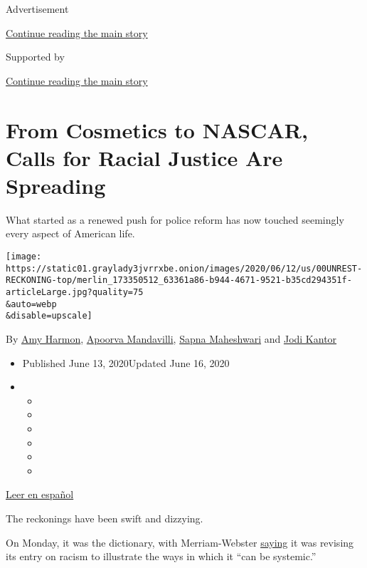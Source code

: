 Advertisement

\protect\hyperlink{after-top}{Continue reading the main story}

Supported by

\protect\hyperlink{after-sponsor}{Continue reading the main story}

\hypertarget{from-cosmetics-to-nascar-calls-for-racial-justice-are-spreading}{%
\section{From Cosmetics to NASCAR, Calls for Racial Justice Are
Spreading}\label{from-cosmetics-to-nascar-calls-for-racial-justice-are-spreading}}

What started as a renewed push for police reform has now touched
seemingly every aspect of American life.

\texttt{[image: https://static01.graylady3jvrrxbe.onion/images/2020/06/12/us/00UNREST-RECKONING-top/merlin\_173350512\_63361a86-b944-4671-9521-b35cd294351f-articleLarge.jpg?quality=75\\\&auto=webp\\\&disable=upscale]}

By \href{https://www.nytimes3xbfgragh.onion/by/amy-harmon}{Amy Harmon},
\href{https://www.nytimes3xbfgragh.onion/by/apoorva-mandavilli}{Apoorva
Mandavilli},
\href{https://www.nytimes3xbfgragh.onion/by/sapna-maheshwari}{Sapna
Maheshwari} and
\href{https://www.nytimes3xbfgragh.onion/by/jodi-kantor}{Jodi Kantor}

\begin{itemize}
\item
  Published June 13, 2020Updated June 16, 2020
\item
  \begin{itemize}
  \item
  \item
  \item
  \item
  \item
  \item
  \end{itemize}
\end{itemize}

\href{https://www.nytimes3xbfgragh.onion/es/2020/06/15/espanol/mundo/racismo-george-floyd-protestas.html}{Leer
en español}

The reckonings have been swift and dizzying.

On Monday, it was the dictionary, with Merriam-Webster
\href{https://www.nytimes3xbfgragh.onion/2020/06/10/us/merriam-webster-racism-definition.html}{saying}
it was revising its entry on racism to illustrate the ways in which it
``can be systemic.''

